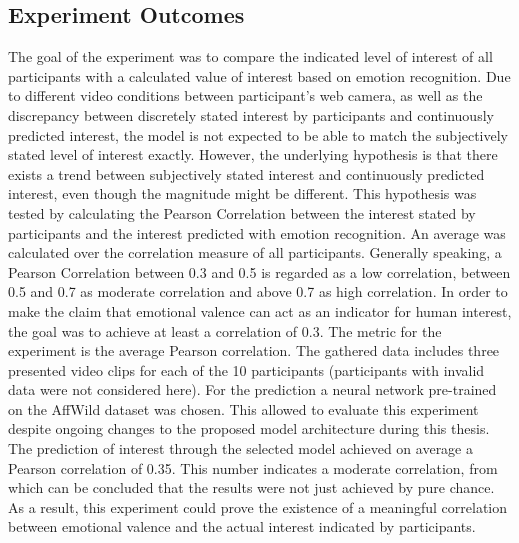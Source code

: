\subsection{Experiment Outcomes} \label{sec:UserExperimentOutcomes}
The goal of the experiment was to compare the indicated level of interest of all participants with a calculated value of interest based on emotion recognition.
\newline\newline
Due to different video conditions between participant's web camera, as well as the discrepancy between discretely stated interest by participants and continuously predicted interest, the model is not expected to be able to match the subjectively stated level of interest exactly. However, the underlying hypothesis is that there exists a trend between subjectively stated interest and continuously predicted interest, even though the magnitude might be different.
\newline\newline
This hypothesis was tested by calculating the Pearson Correlation between the interest stated by participants and the interest predicted with emotion recognition. An average was calculated over the correlation measure of all participants. 
\newline\newline
Generally speaking, a Pearson Correlation between 0.3 and 0.5 is regarded as a low correlation, between 0.5 and 0.7 as moderate correlation and above 0.7 as high correlation. In order to make the claim that emotional valence can act as an indicator for human interest, the goal was to achieve at least a correlation of 0.3.
\newline\newline
The metric for the experiment is the average Pearson correlation. The gathered data includes three presented video clips for each of the 10 participants (participants with invalid data were not considered here). For the prediction a neural network pre-trained on the AffWild dataset was chosen. This allowed to evaluate this experiment despite ongoing changes to the proposed model architecture during this thesis. The prediction of interest through the selected model achieved on average a Pearson correlation of 0.35. This number indicates a moderate correlation, from which can be concluded that the results were not just achieved by pure chance. As a result, this experiment could prove the existence of a meaningful correlation between emotional valence and the actual interest indicated by participants.

